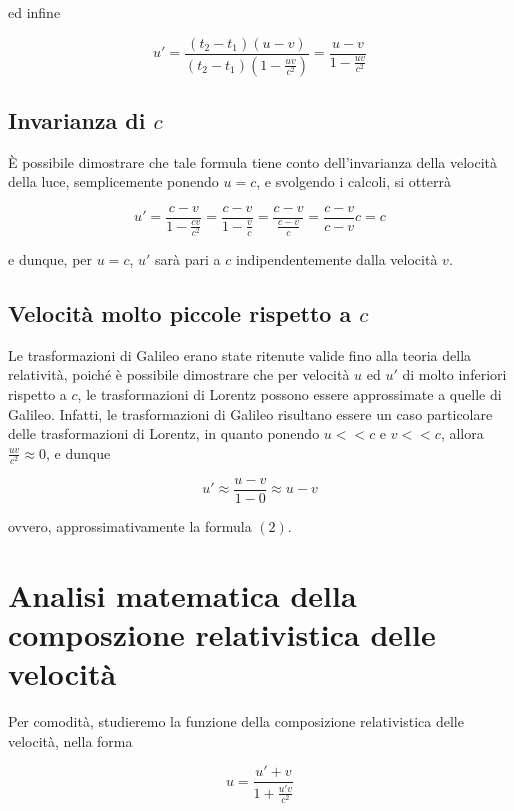 \documentclass{article}
\begin{document}
ed infine

\begin{equation}
    u' = \frac{(t_2 - t_1)(u - v)}{(t_2 - t_1)\left(1 - \frac{uv}{c^2}\right)} = \frac{u - v}{1 - \frac{uv}{c^2}}
\end{equation}

\subsection{Invarianza di \(c\)}
\`{E} possibile dimostrare che tale formula tiene conto dell'invarianza della velocità
della luce, semplicemente ponendo \(u = c\), e svolgendo i calcoli, si otterrà

\begin{equation}
    u' = \frac{c - v}{1 - \frac{cv}{c^2}} = \frac{c - v}{1 - \frac{v}{c}} = \frac{c - v}{\frac{c - v}{c}} = \frac{c - v}{c - v}c = c
\end{equation}

e dunque, per \(u = c\), \(u'\) sarà pari a \(c\) indipendentemente dalla velocità \(v\).

\subsection{Velocità molto piccole rispetto a \(c\)}
Le trasformazioni di Galileo erano state ritenute valide fino alla
teoria della relatività, poiché è possibile dimostrare che per
velocità \(u\) ed \(u'\) di molto inferiori rispetto a \(c\),
le trasformazioni di Lorentz possono essere approssimate a quelle
di Galileo. Infatti, le trasformazioni di Galileo risultano essere un caso
particolare delle trasformazioni di Lorentz, in quanto ponendo
\(u << c\) e \(v << c\), allora \(\frac{uv}{c^2} \approx 0\), e dunque

\begin{equation}
    u' \approx \frac{u - v}{1 - 0} \approx u - v
\end{equation}

ovvero, approssimativamente la formula \((2)\).

\section{Analisi matematica della composzione relativistica delle velocità}
Per comodità, studieremo la funzione della composizione relativistica
delle velocità, nella forma

\begin{equation}
    u = \frac{u' + v}{1 + \frac{u'v}{c^2}}
\end{equation}
\end{document}
